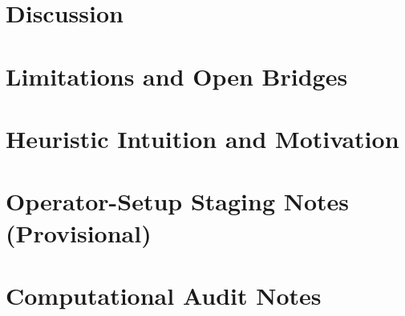 \documentclass[11pt]{article}
\theoremstyle{plain}
\theoremstyle{definition}
\begin{document}
\section{Discussion}


\section{Limitations and Open Bridges}


\clearpage
\appendix
\section{Heuristic Intuition and Motivation}


\section{Operator-Setup Staging Notes (Provisional)}


\section{Computational Audit Notes}


\clearpage
\printbibliography[heading=bibintoc,title={References}]
\end{document}
